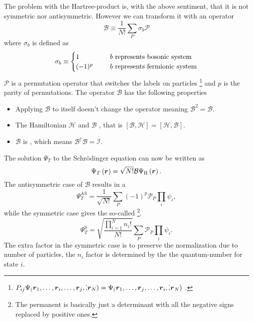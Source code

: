     The problem with the Hartree-product is, with the above sentiment, that it
    is not symmetric nor antisymmetric. However we can transform it with an
    operator
        \begin{equation}
            \mathcal{B} \equiv \frac{1}{N!}\sum_P\sigma_b\mathcal{P}
        \end{equation}
    where $\sigma_b$ is defined as 
        \begin{equation}
            \sigma_b \equiv  
                \begin{cases}
                    1 \indent &\text{$b$ represents bosonic system} \\
                    (-1)^p \indent &\text{$b$ represents fermionic system}
                \end{cases}
        \end{equation}
    $\mathcal{P}$ is a permutation operator that switches the labels on particles
    \footnote{$P_{ij}\Psi_(\boldsymbol{{r}}_1,\dots,\boldsymbol{{r}}_i,\dots,\boldsymbol{{r}}_j,\dot,\boldsymbol{{r}}_N)
    = \Psi_(\boldsymbol{{r}}_1,\dots,\boldsymbol{{r}}_j,\dots,\boldsymbol{{r}}_i,\dot,\boldsymbol{{r}}_N)$
    \cite{compphysThijssen}.} and $p$ is the parity of permutations. The
    operator $\mathcal{B}$ has the following properties
        \begin{itemize}
            \item Applying $\mathcal{B}$ to itself doesn't change the operator
                meaning $\mathcal{B}^2 = \mathcal{B}$.
            \item The Hamiltonian $\mathcal{H}$ and $\mathcal{B}$
                , that is $\left[\mathcal{B},\mathcal{H}\right]
                = \left[\mathcal{H},\mathcal{B}\right]$.
            \item $\mathcal{B}$ is , which means
                $\mathcal{B}^{\dagger}\mathcal{B}=\mathcal{I}$.
        \end{itemize}
    The solution $\Psi_T$ to the Schrödinger equation can now be written as
        \begin{equation}
            \Psi_T\left(\boldsymbol{{r}}\right) =
            \sqrt{N!}\mathcal{B}\Psi_{\text{H}}\left(\boldsymbol{{r}}\right).
            \label{eq:psiOpB}
        \end{equation}
    The antisymmetric case of $\mathcal{B}$ results in a  
        \begin{equation}
            \Psi^{\text{AS}}_T =
            \frac{1}{\sqrt{N!}}\sum_{P}(-1)^p\mathcal{P}_P\prod_i\psi_i,
        \end{equation}
    while the symmetric case gives the so-called \footnote{The
    permanent is basically just a determinant with all the negative signs
    replaced by positive ones.}.
        \begin{equation}
            \Psi^{\text{S}}_T =
            \sqrt{\frac{\prod\limits^N_{i=1}n_i!}{N!}}\sum_{P}\mathcal{P}_P\prod_i\psi_i.
        \end{equation}
   The extra factor in the symmetric case is to preserve the normalization due
   to number of particles, the $n_i$ factor is determined by the the
   quantum-number for state $i$.

